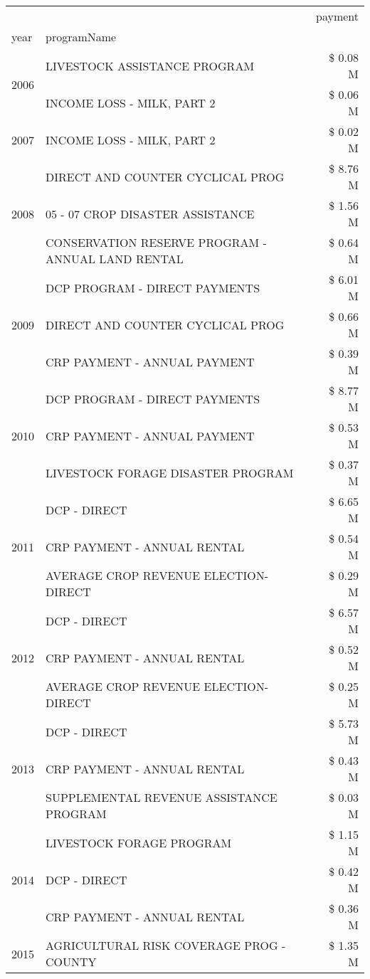 \begin{tabular}{llr}
\toprule
 &  & payment \\
year & programName &  \\
\midrule
\multirow[t]{2}{*}{2006} & LIVESTOCK ASSISTANCE PROGRAM & \$ 0.08 M \\
 & INCOME LOSS - MILK, PART 2 & \$ 0.06 M \\
\cline{1-3}
2007 & INCOME LOSS - MILK, PART 2 & \$ 0.02 M \\
\cline{1-3}
\multirow[t]{3}{*}{2008} & DIRECT AND COUNTER CYCLICAL PROG & \$ 8.76 M \\
 & 05 - 07 CROP DISASTER ASSISTANCE & \$ 1.56 M \\
 & CONSERVATION RESERVE PROGRAM - ANNUAL LAND RENTAL & \$ 0.64 M \\
\cline{1-3}
\multirow[t]{3}{*}{2009} & DCP PROGRAM - DIRECT PAYMENTS & \$ 6.01 M \\
 & DIRECT AND COUNTER CYCLICAL PROG & \$ 0.66 M \\
 & CRP PAYMENT - ANNUAL PAYMENT & \$ 0.39 M \\
\cline{1-3}
\multirow[t]{3}{*}{2010} & DCP PROGRAM - DIRECT PAYMENTS & \$ 8.77 M \\
 & CRP PAYMENT - ANNUAL PAYMENT & \$ 0.53 M \\
 & LIVESTOCK FORAGE DISASTER  PROGRAM & \$ 0.37 M \\
\cline{1-3}
\multirow[t]{3}{*}{2011} & DCP - DIRECT & \$ 6.65 M \\
 & CRP PAYMENT - ANNUAL RENTAL & \$ 0.54 M \\
 & AVERAGE CROP REVENUE ELECTION-DIRECT & \$ 0.29 M \\
\cline{1-3}
\multirow[t]{3}{*}{2012} & DCP - DIRECT & \$ 6.57 M \\
 & CRP PAYMENT - ANNUAL RENTAL & \$ 0.52 M \\
 & AVERAGE CROP REVENUE ELECTION-DIRECT & \$ 0.25 M \\
\cline{1-3}
\multirow[t]{3}{*}{2013} & DCP - DIRECT & \$ 5.73 M \\
 & CRP PAYMENT - ANNUAL RENTAL & \$ 0.43 M \\
 & SUPPLEMENTAL REVENUE ASSISTANCE PROGRAM & \$ 0.03 M \\
\cline{1-3}
\multirow[t]{3}{*}{2014} & LIVESTOCK FORAGE PROGRAM & \$ 1.15 M \\
 & DCP - DIRECT & \$ 0.42 M \\
 & CRP PAYMENT - ANNUAL RENTAL & \$ 0.36 M \\
\cline{1-3}
\multirow[t]{3}{*}{2015} & AGRICULTURAL RISK COVERAGE PROG - COUNTY & \$ 1.35 M \\

\end{tabular}
